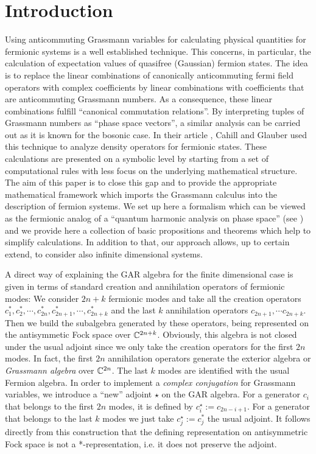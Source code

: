 \documentclass[pra,twoside,amsmath,amsfonts,amssymb,superscriptaddress,showpacs]{revtex4}
\def\7#1{{\Bbb #1}}
\newcommand{\ADJ}{\star}
\begin{document}
\section{Introduction}
\label{sec:intro}
Using anticommuting Grassmann variables for calculating physical quantities for fermionic systems is
a well established technique. This concerns, in particular, the calculation of
expectation values of quasifree (Gaussian) fermion states. The idea is to
replace the linear combinations of canonically anticommuting fermi field operators with complex
coefficients by linear
combinations with coefficients that are anticommuting Grassmann numbers. As a consequence, these
linear combinations fulfill ``canonical commutation relations''. By interpreting tuples of
Grassmann numbers as ``phase space vectors'', a similar analysis can be carried out as it is known
for the bosonic case. In their article \cite{CahGlau99}, Cahill and Glauber used this technique to
analyze density operators for
fermionic states. These calculations are presented on a symbolic level by starting from a set of
computational rules with less focus on the underlying mathematical structure. The aim of this
paper is to close this gap and to provide the appropriate mathematical framework which
imports the Grassmann calculus into the description of fermion systems. We set up here a formalism
which can be viewed as the fermionic analog of a ``quantum
harmonic analysis on phase space'' (see \cite{WeQMPS}) and we provide here a collection of basic
propositions and theorems which help to simplify calculations. In addition to that, our approach
allows, up to certain extend, to consider also infinite
dimensional systems.

A direct way of explaining the GAR algebra for the finite dimensional case is given in terms of
standard creation and annihilation operators of fermionic modes: We consider $2n+k$ fermionic modes
and take all the creation operators $c_1^*,c_2^*,\cdots,c_{2n}^*,c_{2n+1}^*,\cdots , c_{2n+k}^*$ and
the last $k$ annihilation operators $c_{2n+1},\cdots c_{2n+k}$. Then we build the
subalgebra generated by these operators, being represented on the antisymmetic Fock space over
$\7C^{2n+k}$. Obviously, this algebra is not closed under the usual adjoint since we only take the
creation operators for the first $2n$ modes. In fact,
the first $2n$ annihilation operators generate the exterior algebra or {\em Grassmann algebra} over
$\7C^{2n}$. The last $k$ modes are identified with the usual Fermion algebra. In
order to implement a {\em complex conjugation} for Grassmann variables, we introduce a ``new''
adjoint $\ADJ$ on the GAR algebra. For a generator $c_i$ that belongs to the first $2n$ modes, it
is defined by $c_i^\ADJ:=c_{2n-i+1}$. For a generator that belongs to the last $k$ modes we just
take $c_j^\ADJ:=c_j^*$ the usual adjoint. It follows directly from this construction that the
defining
representation on antisymmetric Fock space is not a *-representation, i.e. it does not preserve the
adjoint. 
\end{document}
